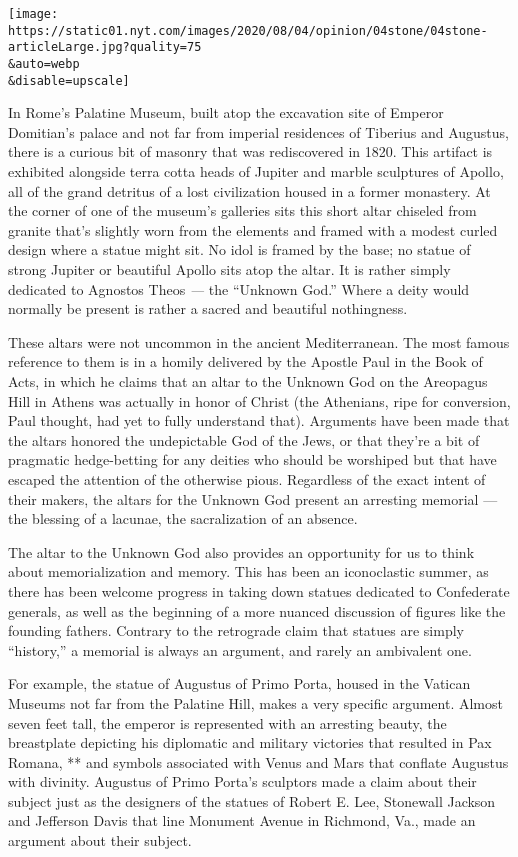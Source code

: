 \texttt{[image: https://static01.nyt.com/images/2020/08/04/opinion/04stone/04stone-articleLarge.jpg?quality=75\\\&auto=webp\\\&disable=upscale]}

In Rome's Palatine Museum, built atop the excavation site of Emperor
Domitian's palace and not far from imperial residences of Tiberius and
Augustus, there is a curious bit of masonry that was rediscovered in
1820. This artifact is exhibited alongside terra cotta heads of Jupiter
and marble sculptures of Apollo, all of the grand detritus of a lost
civilization housed in a former monastery. At the corner of one of the
museum's galleries sits this short altar chiseled from granite that's
slightly worn from the elements and framed with a modest curled design
where a statue might sit. No idol is framed by the base; no statue of
strong Jupiter or beautiful Apollo sits atop the altar. It is rather
simply dedicated to Agnostos Theos \emph{---} the ``Unknown God.'' Where
a deity would normally be present is rather a sacred and beautiful
nothingness.

These altars were not uncommon in the ancient Mediterranean. The most
famous reference to them is in a homily delivered by the Apostle Paul in
the Book of Acts, in which he claims that an altar to the Unknown God on
the Areopagus Hill in Athens was actually in honor of Christ (the
Athenians, ripe for conversion, Paul thought, had yet to fully
understand that). Arguments have been made that the altars honored the
undepictable God of the Jews, or that they're a bit of pragmatic
hedge-betting for any deities who should be worshiped but that have
escaped the attention of the otherwise pious. Regardless of the exact
intent of their makers, the altars for the Unknown God present an
arresting memorial --- the blessing of a lacunae, the sacralization of
an absence.

The altar to the Unknown God also provides an opportunity for us to
think about memorialization and memory. This has been an iconoclastic
summer, as there has been welcome progress in taking down statues
dedicated to Confederate generals, as well as the beginning of a more
nuanced discussion of figures like the founding fathers. Contrary to the
retrograde claim that statues are simply ``history,'' a memorial is
always an argument, and rarely an ambivalent one.

For example, the statue of Augustus of Primo Porta, housed in the
Vatican Museums not far from the Palatine Hill, makes a very specific
argument. Almost seven feet tall, the emperor is represented with an
arresting beauty, the breastplate depicting his diplomatic and military
victories that resulted in Pax Romana, ** and symbols associated with
Venus and Mars that conflate Augustus with divinity. Augustus of Primo
Porta's sculptors made a claim about their subject just as the designers
of the statues of Robert E. Lee, Stonewall Jackson and Jefferson Davis
that line Monument Avenue in Richmond, Va., made an argument about their
subject.

